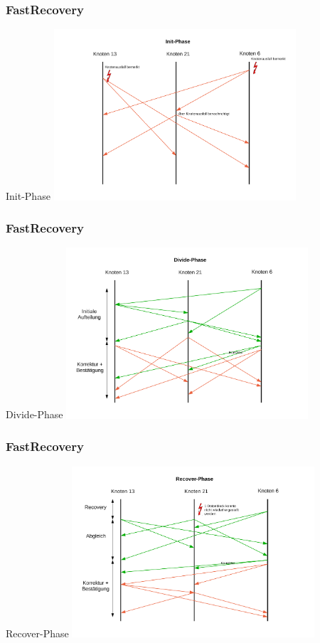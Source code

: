 \documentclass{beamer}
\begin{document}
		\begin{frame}
			\frametitle{FastRecovery}

			\begin{block}{Init-Phase}
				\center\includegraphics[width=9cm]{../img/recovery_init}
			\end{block}
		\end{frame}

		\begin{frame}
			\frametitle{FastRecovery}

			\begin{block}{Divide-Phase}
				\center\includegraphics[width=9cm]{../img/recovery_divide}
			\end{block}
		\end{frame}

		\begin{frame}
			\frametitle{FastRecovery}

			\begin{block}{Recover-Phase}
				\center\includegraphics[width=9cm]{../img/recovery_recover}
			\end{block}
		\end{frame}
\end{document}
